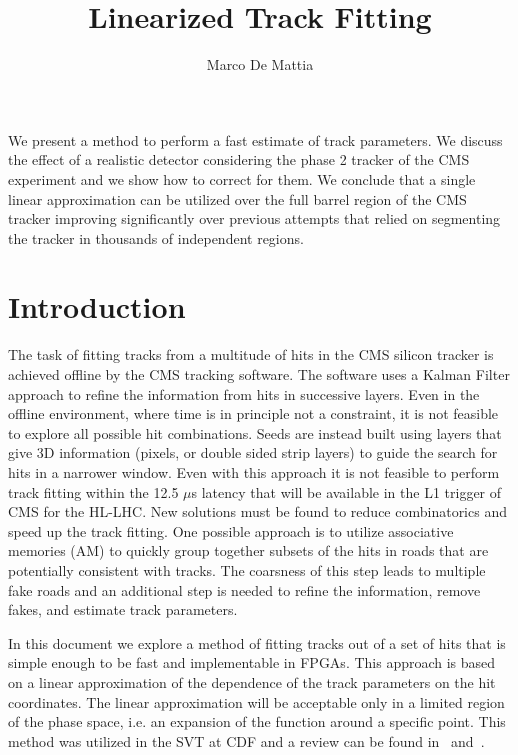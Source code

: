 \documentclass[10pt,a4paper]{report}
\begin{document}
\author{Marco De Mattia}
\title{Linearized Track Fitting}
\maketitle

\abstract

We present a method to perform a fast estimate of track parameters. We discuss the effect of a realistic detector considering the phase 2 tracker of the CMS experiment and we show how to correct for them. We conclude that a single linear approximation can be utilized over the full barrel region of the CMS tracker improving significantly over previous attempts that relied on segmenting the tracker in thousands of independent regions.

\section{Introduction}

The task of fitting tracks from a multitude of hits in the CMS silicon tracker is achieved offline by the CMS tracking software. The software uses a Kalman Filter approach to refine the information from hits in successive layers. Even in the offline environment, where time is in principle not a constraint, it is not feasible to explore all possible hit combinations. Seeds are instead built using layers that give 3D information (pixels, or double sided strip layers) to guide the search for hits in a narrower window. Even with this approach it is not feasible to perform track fitting within the 12.5 $\mu$s latency that will be available in the L1 trigger of CMS for the HL-LHC. New solutions must be found to reduce combinatorics and speed up the track fitting. One possible approach is to utilize associative memories (AM) to quickly group together subsets of the hits in roads that are potentially consistent with tracks. The coarsness of this step leads to multiple fake roads and an additional step is needed to refine the information, remove fakes, and estimate track parameters.

In this document we explore a method of fitting tracks out of a set of hits that is simple enough to be fast and implementable in FPGAs. This approach is based on a linear approximation of the dependence of the track parameters on the hit coordinates. The linear approximation will be acceptable only in a limited region of the phase space, i.e. an expansion of the function around a specific point. This method was utilized in the SVT at CDF and a review can be found in~\cite{SVTReview} and~\cite{SVTReviewFermilab}.
\end{document}
